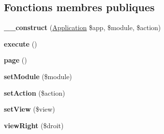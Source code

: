 \subsection*{Fonctions membres publiques}
\begin{DoxyCompactItemize}
\item 
\hypertarget{class_library_1_1_back_controller_a5be4df6d47d7e8f0d19cd9d64a94dfb1}{{\bfseries \+\_\+\+\_\+construct} (\hyperlink{class_library_1_1_application}{Application} \$app, \$module, \$action)}\label{class_library_1_1_back_controller_a5be4df6d47d7e8f0d19cd9d64a94dfb1}

\item 
\hypertarget{class_library_1_1_back_controller_a1909f4b7f8129c7790cb75de2ffbe1e4}{{\bfseries execute} ()}\label{class_library_1_1_back_controller_a1909f4b7f8129c7790cb75de2ffbe1e4}

\item 
\hypertarget{class_library_1_1_back_controller_a99516ac9c016d952f8daa43b673d6b3c}{{\bfseries page} ()}\label{class_library_1_1_back_controller_a99516ac9c016d952f8daa43b673d6b3c}

\item 
\hypertarget{class_library_1_1_back_controller_a19ce94bf700387486bfc97366dc934e3}{{\bfseries set\+Module} (\$module)}\label{class_library_1_1_back_controller_a19ce94bf700387486bfc97366dc934e3}

\item 
\hypertarget{class_library_1_1_back_controller_a0366b3b0db0bd90abfc461c372f86599}{{\bfseries set\+Action} (\$action)}\label{class_library_1_1_back_controller_a0366b3b0db0bd90abfc461c372f86599}

\item 
\hypertarget{class_library_1_1_back_controller_ab7b32659820de59ffe097cd1848f5d36}{{\bfseries set\+View} (\$view)}\label{class_library_1_1_back_controller_ab7b32659820de59ffe097cd1848f5d36}

\item 
\hypertarget{class_library_1_1_back_controller_adf9cccd3a283728e352de1b346d506f5}{{\bfseries view\+Right} (\$droit)}\label{class_library_1_1_back_controller_adf9cccd3a283728e352de1b346d506f5}

\end{DoxyCompactItemize}
